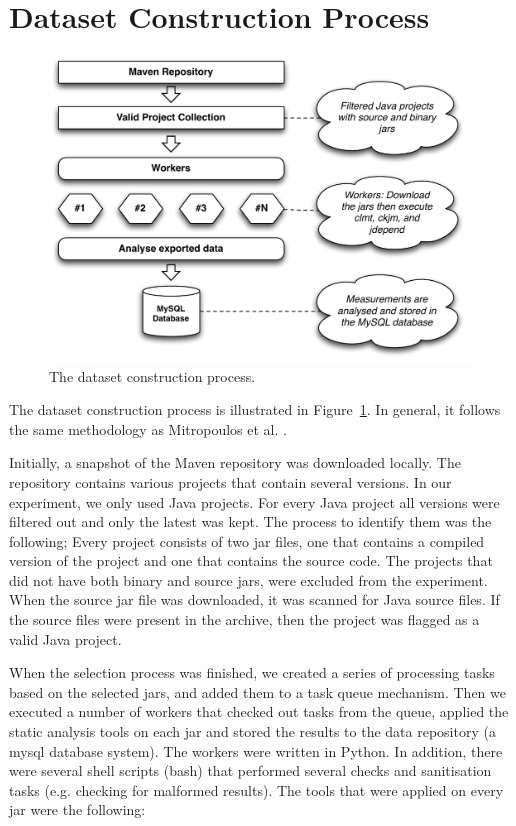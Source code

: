 \documentclass[conference]{IEEEtran}
\begin{document}
\section{Dataset Construction Process}
\label{sec:data}

\begin{figure}
\centering
\includegraphics[scale=0.45]{import-process}
\caption{The dataset construction process.}
\label{fig:dataset-construction}
\end{figure}

The dataset construction process is illustrated in Figure~\ref{fig:dataset-construction}. In general, it follows the same methodology as Mitropoulos et al. \cite{MKLGS14}.

Initially, a snapshot of the Maven repository was downloaded locally. The repository contains various projects that contain several versions. In our experiment, we only used Java projects. For every Java project all versions were filtered out and only the latest was kept. The process to identify them was the following; Every project consists of two {\sc jar} files, one that contains a compiled version of the project and one that contains the source code. The projects that did not have both binary and source {\sc jar}s, were excluded from the experiment. When the source {\sc jar} file was downloaded, it was scanned for Java source files. If the source files were present in the archive, then the project was flagged as a valid Java project.

When the selection process was finished, we created a series of processing tasks based on the selected {\sc jar}s, and added them to a task queue mechanism. Then we executed a number of workers that checked out tasks from the queue, applied the static analysis tools on each {\sc jar} and stored the results to the data repository (a {\sc m}y{\sc sql} database system). The workers were written in Python. In addition, there were several shell scripts (bash) that performed several checks and sanitisation tasks (e.g. checking for malformed results). The tools that were applied on every {\sc jar} were the following:
\end{document}
